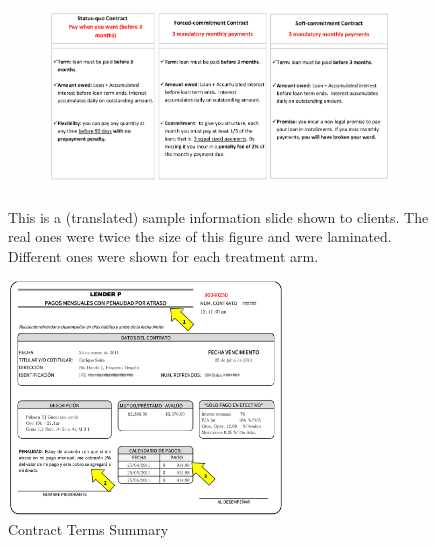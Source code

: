 \documentclass[oneside,11pt]{article}
\begin{document}
{\begin{figure}[H]
     \caption{Explanatory Material}
    \label{ExplanatoryMaterial}
    \begin{center}
    \begin{subfigure}{\textwidth}
        \centering
        \includegraphics[width=\textwidth]{Figuras/micas.pdf}
    \end{subfigure}
    \end{center}
    \scriptsize
        This is a (translated) sample information slide shown to clients. The real ones were twice the size of this figure and were laminated. Different ones were shown for each treatment arm.
\end{figure}

\begin{figure}[H]
     \caption{Contract Terms Summary}
    \label{PaperSlip}
    \begin{center}
        \includegraphics[width=0.65\textwidth]{Figuras/TicketLenderP.png}
    

\end{center}
\end{figure}}
\end{document}
